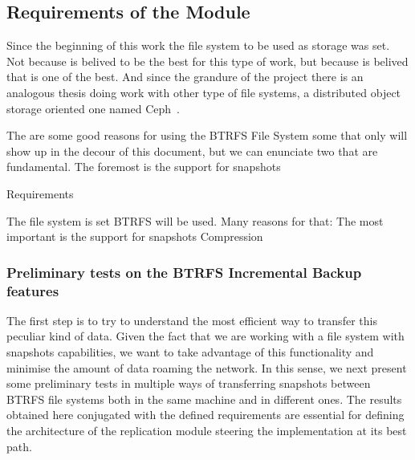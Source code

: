 \subsection{Requirements of the Module}
\label{sub:requirements_icbdrep}

Since the beginning of this work the file system to be used as storage was set. Not because is belived to be the best for this type of work, but because is belived that is one of the best. And since the grandure of the project there is an analogous thesis doing work with other type of file systems, a distributed object storage oriented one named Ceph~\cite{Weil2006}.


The are some good reasons for using the BTRFS File System some that only will show up in the decour of this document, but we can enunciate two that are fundamental. The foremost is the support for snapshots

Requirements

The file system is set BTRFS will be used.
Many reasons for that:
The most important is the support for snapshots
Compression


\subsubsection{Preliminary tests on the BTRFS Incremental Backup features}
\label{subsub:pre_test_btrfs}


The first step is to try to understand the most efficient way to transfer this peculiar kind of data. Given the fact that we are working with a file system with snapshots capabilities, we want to take advantage of this functionality and minimise the amount of data roaming the network. In this sense, we next present some preliminary tests in multiple ways of transferring snapshots between BTRFS file systems both in the same machine and in different ones.
The results obtained here conjugated with the defined requirements are essential for defining the architecture of the replication module steering the implementation at its best path.

